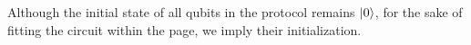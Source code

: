 Although the initial state of all qubits in the protocol remains $\ket{0}$, for the sake of fitting the circuit within the page, we imply their initialization.

%    
%
